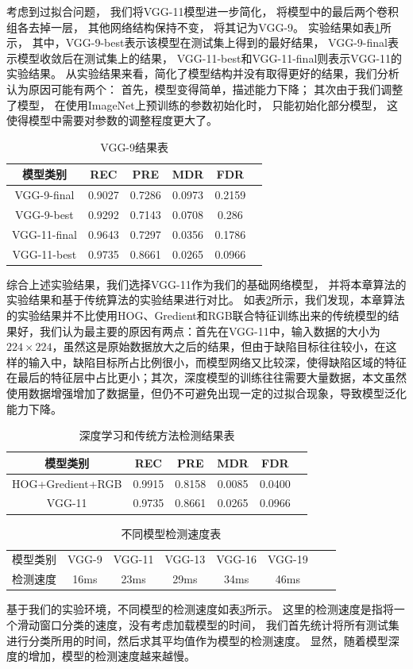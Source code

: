 考虑到过拟合问题，
我们将VGG-11模型进一步简化，
将模型中的最后两个卷积组各去掉一层，
其他网络结构保持不变，
将其记为VGG-9。
实验结果如表\ref{tab:jianhuajiegou}所示，
其中，VGG-9-best表示该模型在测试集上得到的最好结果，
VGG-9-final表示模型收敛后在测试集上的结果，
VGG-11-best和VGG-11-final则表示VGG-11的实验结果。
从实验结果来看，简化了模型结构并没有取得更好的结果，我们分析认为原因可能有两个：
首先，模型变得简单，描述能力下降；
其次由于我们调整了模型，
在使用ImageNet上预训练的参数初始化时，
只能初始化部分模型，
这使得模型中需要对参数的调整程度更大了。
\begin{table}[htbp]
\centering
\begin{tabular}{cccccp{38mm}}
\toprule
\textbf{模型类别} & \textbf{REC} & \textbf{PRE} & \textbf{MDR} & \textbf{FDR}\\
\midrule
\mbox{VGG-9-final} & 0.9027 & 0.7286 & 0.0973 & 0.2159\\
\mbox{VGG-9-best} & 0.9292 & 0.7143 & 0.0708 & 0.286\\
\mbox{VGG-11-final} & 0.9643 & 0.7297 & 0.0356 & 0.1786\\
\mbox{VGG-11-best} & 0.9735 & 0.8661 & 0.0265 & 0.0966\\
\bottomrule
\end{tabular}
\caption{VGG-9结果表}
\label{tab:jianhuajiegou}
\end{table}

综合上述实验结果，我们选择VGG-11作为我们的基础网络模型，
并将本章算法的实验结果和基于传统算法的实验结果进行对比。
如表\ref{tab:shenduxuexijieguo}所示，我们发现，本章算法的实验结果并不比使用HOG、Gredient和RGB联合特征训练出来的传统模型的结果好，我们认为最主要的原因有两点：首先在VGG-11中，输入数据的大小为$224\times 224$，虽然这是原始数据放大之后的结果，但由于缺陷目标往往较小，在这样的输入中，缺陷目标所占比例很小，而模型网络又比较深，使得缺陷区域的特征在最后的特征层中占比更小；其次，深度模型的训练往往需要大量数据，本文虽然使用数据增强增加了数据量，但仍不可避免出现一定的过拟合现象，导致模型泛化能力下降。
\begin{table}[htbp]
\centering
\begin{tabular}{cccccp{38mm}}
\toprule
\textbf{模型类别} & \textbf{REC} & \textbf{PRE} & \textbf{MDR} & \textbf{FDR}\\
\midrule
\mbox{HOG+Gredient+RGB} & 0.9915 & 0.8158 & 0.0085 & 0.0400\\
\mbox{VGG-11} & 0.9735 & 0.8661 & 0.0265 & 0.0966\\
\bottomrule
\end{tabular}
\caption{深度学习和传统方法检测结果表}
\label{tab:shenduxuexijieguo}
\end{table}
\begin{table}[htbp]
\centering
\begin{tabular}{cccccccp{38mm}}
\toprule
\mbox{模型类别} & \mbox{VGG-9} & \mbox{VGG-11} & \mbox{VGG-13} & \mbox{VGG-16} & \mbox{VGG-19}  \\
\mbox{检测速度} & 16ms & 23ms & 29ms & 34ms & 46ms  \\
\bottomrule
\end{tabular}
\caption{不同模型检测速度表}
\label{tab:jiancesudu}
\end{table}

基于我们的实验环境，不同模型的检测速度如表\ref{tab:jiancesudu}所示。
这里的检测速度是指将一个滑动窗口分类的速度，没有考虑加载模型的时间，
我们首先统计将所有测试集进行分类所用的时间，然后求其平均值作为模型的检测速度。
显然，随着模型深度的增加，模型的检测速度越来越慢。
